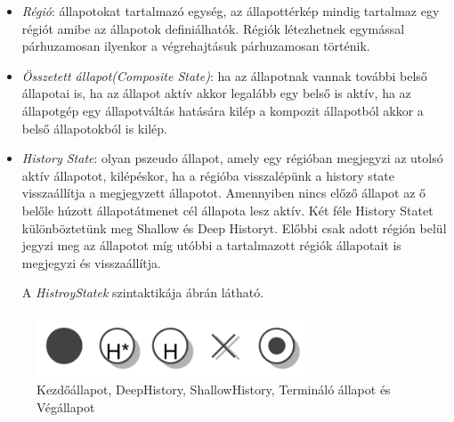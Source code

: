 \begin{itemize}	
	\item \emph{Régió}: állapotokat tartalmazó egység, az állapottérkép mindig tartalmaz egy régiót amibe az állapotok definiálhatók. Régiók létezhetnek egymással párhuzamosan ilyenkor a végrehajtásuk párhuzamosan történik.
	\item \emph{Összetett állapot(Composite State)}: ha az állapotnak vannak további belső állapotai is, ha az állapot aktív akkor legalább egy belső is aktív, ha az állapotgép egy állapotváltás hatására kilép a kompozit állapotból akkor a belső állapotokból is kilép.
	\item \emph{History State}: olyan pszeudo állapot, amely egy régióban megjegyzi az utolsó aktív állapotot, kilépéskor, ha a régióba visszalépünk a history state visszaállítja a megjegyzett állapotot. Amennyiben nincs előző állapot az ő belőle húzott állapotátmenet cél állapota lesz aktív. Két féle History Statet különböztetünk meg Shallow és Deep Historyt. Előbbi csak adott régión belül jegyzi meg az állapotot míg utóbbi a tartalmazott régiók állapotait is megjegyzi és visszaállítja.
	
	A \emph{HistroyStatek} szintaktikája  ábrán látható.
	
\end{itemize}

\begin{figure}[!ht]
	\centering
	\includegraphics[keepaspectratio, width=80mm]{figures/pseudo-and-final.png}
	\caption{Kezdőállapot, DeepHistory, ShallowHistory, Termináló állapot és Végállapot}
	\label{fig:pseudo-and-final}
\end{figure}


